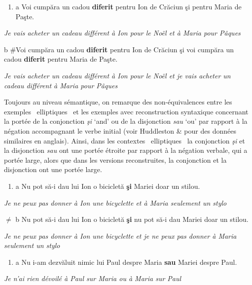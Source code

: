 \begin{enumerate}
\item \label{bkm:Ref290305778}a  Voi cumpăra un cadou \textbf{diferit} pentru Ion de Crăciun şi pentru Maria de Paşte.


\end{enumerate}
{\itshape
Je vais acheter un cadeau différent à Ion pour le Noël et à Maria pour Pâques}

  b  \#Voi cumpăra un cadou \textbf{diferit} pentru Ion de Crăciun şi voi cumpăra un cadou \textbf{diferit} pentru Maria de Paşte.

{\itshape
Je vais acheter un cadeau différent à Ion pour le Noël et je vais acheter un cadeau différent à Maria pour Pâques}

Toujours au niveau sémantique, on remarque des non-équivalences entre les exemples {\guillemotleft}~elliptiques~{\guillemotright} et les exemples avec reconstruction syntaxique concernant la portée de la conjonction \textit{şi} `and'  ou de la disjonction \textit{sau} `ou'  par rapport à la négation accompagnant le verbe initial (voir Huddleston \& \citet{Pullum2002} pour des données similaires en anglais). Ainsi, dans les contextes {\guillemotleft}~elliptiques~{\guillemotright} la conjonction \textit{şi} et la disjonction \textit{sau} ont une portée étroite par rapport à la négation verbale, qui a portée large, alors que dans les versions reconstruites, la conjonction et la disjonction ont une portée large.  


\begin{enumerate}
\item \label{bkm:Ref302394036}a  Nu pot să-i dau lui Ion o bicicletă \textbf{şi} Mariei doar un stilou.


\end{enumerate}
{\itshape
Je ne peux pas donner à Ion une bicyclette et à Maria seulement un stylo}

${\neq}$  b  Nu pot să-i dau lui Ion o bicicletă \textbf{şi} nu pot să-i dau Mariei doar un stilou.

\textit{Je ne peux pas donner à Ion une bicyclette et je ne peux pas donner à Maria seulement un stylo} 


\begin{enumerate}
\item \label{bkm:Ref302394055}a  Nu i-am dezvăluit nimic lui Paul despre Maria \textbf{sau} Mariei despre Paul.


\end{enumerate}
{\itshape
Je n'ai rien dévoilé à Paul sur Maria ou à Maria sur Paul}

